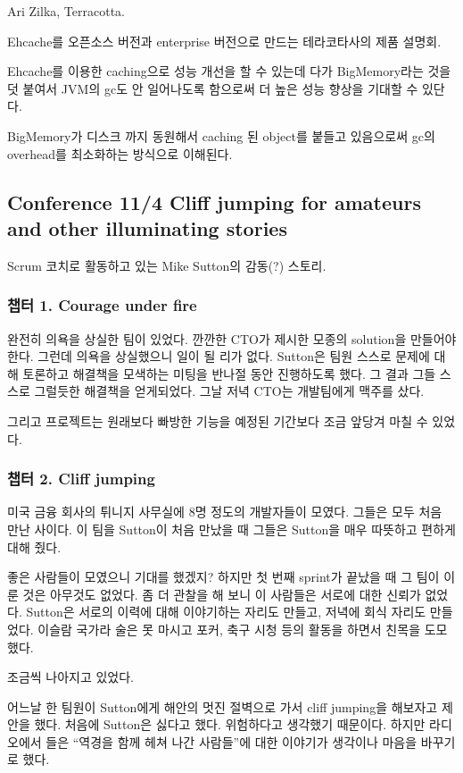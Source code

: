 \documentclass[a4paper]{article}
\begin{document}
Ari Zilka, Terracotta.
 
Ehcache를 오픈소스 버전과 enterprise 버전으로 만드는 테라코타사의 제품 설명회.
 
Ehcache를 이용한 caching으로 성능 개선을 할 수 있는데 다가
BigMemory라는 것을 덧 붙여서 JVM의 gc도 안 일어나도록 함으로써 더 높은
성능 향상을 기대할 수 있단다.
 
BigMemory가 디스크 까지 동원해서 caching 된 object를 붙들고 있음으로써
gc의 overhead를 최소화하는 방식으로 이해된다.
 
\subsection{Conference 11/4 Cliff jumping for amateurs and other
  illuminating stories}
 
Scrum 코치로 활동하고 있는 Mike Sutton의 감동(?) 스토리.
 
\subsubsection{챕터 1. Courage under fire}
 
완전히 의욕을 상실한 팀이 있었다. 깐깐한 CTO가 제시한 모종의 solution을
만들어야 한다.  그런데 의욕을 상실했으니 일이 될 리가 없다. Sutton은
팀원 스스로 문제에 대해 토론하고 해결책을 모색하는 미팅을 반나절 동안
진행하도록 했다. 그 결과 그들 스스로 그럴듯한 해결책을 얻게되었다. 그날
저녁 CTO는 개발팀에게 맥주를 샀다.
 
그리고 프로젝트는 원래보다 빠방한 기능을 예정된 기간보다 조금 앞당겨 마칠 수 있었다.
 
\subsubsection{챕터 2. Cliff jumping}
 
미국 금융 회사의 튀니지 사무실에 8명 정도의 개발자들이 모였다. 그들은
모두 처음 만난 사이다.  이 팀을 Sutton이 처음 만났을 때 그들은 Sutton을
매우 따뜻하고 편하게 대해 줬다.
 
좋은 사람들이 모였으니 기대를 했겠지? 하지만 첫 번째 sprint가 끝났을 때
그 팀이 이룬 것은 아무것도 없었다. 좀 더 관찰을 해 보니 이 사람들은
서로에 대한 신뢰가 없었다. Sutton은 서로의 이력에 대해 이야기하는
자리도 만들고, 저녁에 회식 자리도 만들었다. 이슬람 국가라 술은 못
마시고 포커, 축구 시청 등의 활동을 하면서 친목을 도모했다.
 
조금씩 나아지고 있었다.
 
어느날 한 팀원이 Sutton에게 해안의 멋진 절벽으로 가서 cliff jumping을
해보자고 제안을 했다. 처음에 Sutton은 싫다고 했다. 위험하다고 생각했기
때문이다.  하지만 라디오에서 들은 ``역경을 함께 헤쳐 나간 사람들''에 대한
이야기가 생각이나 마음을 바꾸기로 했다.
 
\end{document}
